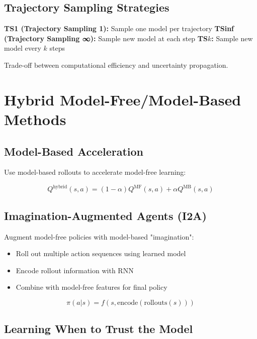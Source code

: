 \subsection{Trajectory Sampling Strategies}

\textbf{TS1 (Trajectory Sampling 1):} Sample one model per trajectory
\textbf{TSinf (Trajectory Sampling ∞):} Sample new model at each step
\textbf{TS$k$:} Sample new model every $k$ steps

Trade-off between computational efficiency and uncertainty propagation.

\section{Hybrid Model-Free/Model-Based Methods}

\subsection{Model-Based Acceleration}

Use model-based rollouts to accelerate model-free learning:

\begin{equation}
Q^{\text{hybrid}}(s,a) = (1-\alpha) Q^{\text{MF}}(s,a) + \alpha Q^{\text{MB}}(s,a)
\end{equation}

\subsection{Imagination-Augmented Agents (I2A)}

Augment model-free policies with model-based "imagination":

\begin{itemize}
    \item Roll out multiple action sequences using learned model
    \item Encode rollout information with RNN
    \item Combine with model-free features for final policy
\end{itemize}

\begin{equation}
\pi(a|s) = f(s, \text{encode}(\text{rollouts}(s)))
\end{equation}

\subsection{Learning When to Trust the Model}

